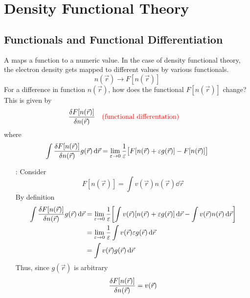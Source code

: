 \documentclass[12pt,a4paper,titlepage]{article}
\newcommand\hruleMod{%
	\vskip12pt
	\nointerlineskip
	{\color{lightgray}\leaders\vrule width \textwidth\vskip0.4pt}
	\nointerlineskip
	\vskip12pt
}
\newcommand{\aside}[3][]{ %
	\ifthenelse{\equal{#1}{}}{\hruleMod}{}
	\begin{itemize}[align=left,labelindent=0em,labelwidth=3em,labelsep*=0.5em,leftmargin=!]
		\item[\ul{#2}:]{#3}
	\end{itemize}
	\ifthenelse{\equal{#1}{}}{\hruleMod}{}
}
\newcommand{\ul}[1]{\underline{\smash{#1}}} %
\begin{document}
\newpage
\section{Density Functional Theory}
\subsection{Functionals and Functional Differentiation}
A \ul{functional} maps a function to a numeric value. In the case of density functional theory, the electron density gets mapped to different values by various functionals.
\[
n(\vec{r})\rightarrow F[n(\vec{r})]
\]
For a difference in function $n(\vec{r})$, how does the functional $F[n(\vec{r})]$ change? This is given by
\[
\fdv{F[n(\vec{r})]}{n(\vec{r})}\qq{\color{red}(functional differentation)}
\]
where
\begin{equation}
\int\fdv{F[n(\vec{r})]}{n(\vec{r})}g(\vec{r})\dd{\vec{r}}=\lim_{\varepsilon\rightarrow0}\frac{1}{\varepsilon}\big[F[n(\vec{r})+\varepsilon g(\vec{r})]-F[n(\vec{r})]\big]
\end{equation}

\begin{center}
\end{center}

\aside{Ex}{Consider
\begin{equation}
F[n(\vec{r})]=\int v(\vec{r})n(\vec{r})\dd{\vec{r}}
\end{equation}
By definition
\begin{equation}
\begin{aligned}
\int\fdv{F[n(\vec{r})]}{n(\vec{r})}g(\vec{r})\dd{\vec{r}}&=\lim_{\varepsilon\rightarrow0}\frac{1}{\varepsilon}\qty[\int v(\vec{r})[n(\vec{r})+\varepsilon g(\vec{r})]\dd{\vec{r}}-\int v(\vec{r})n(\vec{r})\dd{\vec{r}}]\\
&=\lim_{\varepsilon\rightarrow0}\frac{1}{\varepsilon}\int v(\vec{r})\varepsilon g(\vec{r})\dd{\vec{r}}\\
&=\int v(\vec{r})g(\vec{r})\dd{\vec{r}}
\end{aligned}
\end{equation}
Thus, since $g(\vec{r})$ is arbitrary
\begin{equation}
\fdv{F[n(\vec{r})]}{n(\vec{r})}=v(\vec{r})
\end{equation}
}
\end{document}
